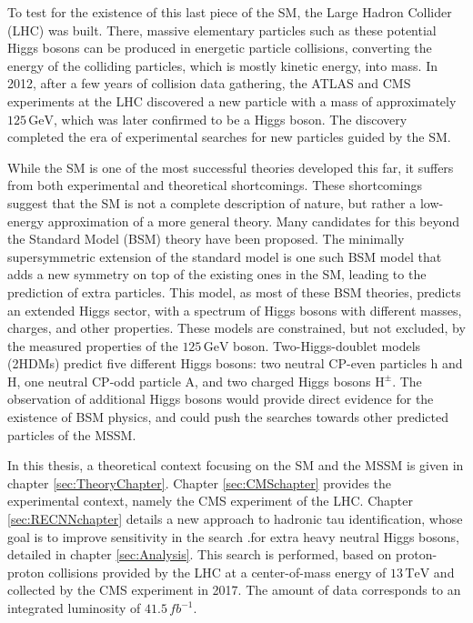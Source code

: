 To test for the existence of this last piece of the SM, the Large Hadron Collider (LHC) was built. There, massive elementary particles such as these potential Higgs bosons can be produced in energetic particle collisions, converting the energy of the colliding particles, which is mostly kinetic energy, into mass. In 2012, after a few years of collision data gathering, the ATLAS and CMS experiments at the LHC discovered a new particle with a mass of approximately $125\,\mathrm{GeV}$, which was later confirmed to be a Higgs boson. The discovery completed the era of experimental searches for new particles guided by the SM.

While the SM is one of the most successful theories developed this far, it suffers from
both experimental and theoretical shortcomings. These shortcomings suggest that the SM is not a complete description of nature, but rather a low-energy approximation of a more general theory. Many candidates for this beyond the Standard Model (BSM) theory have been proposed. The minimally supersymmetric extension of the standard model is one such BSM model that adds a new symmetry on top of the existing ones in the SM, leading to the prediction of extra particles. This model, as most of these BSM theories, predicts an extended Higgs sector, with a spectrum of Higgs bosons with different masses, charges, and other properties.  These models are constrained, but not excluded, by the measured properties of the $125\,\mathrm{GeV}$ boson. Two-Higgs-doublet models (2HDMs) predict five different Higgs bosons: two neutral CP-even particles h and H, one neutral CP-odd particle A, and two charged Higgs bosons $\mathrm{H^{\pm}}$. The observation of additional Higgs bosons would provide direct evidence for the existence of BSM physics, and could push the searches towards other predicted particles of the MSSM.

In this thesis, a theoretical context focusing on the SM and the MSSM is given in chapter \ref{sec:TheoryChapter}. Chapter \ref{sec:CMSchapter} provides the experimental context, namely the CMS experiment of the LHC. Chapter \ref{sec:RECNNchapter} details a new approach to hadronic tau identification, whose goal is to improve sensitivity in the search .for extra heavy neutral Higgs bosons, detailed in chapter \ref{sec:Analysis}. This search is performed, based on proton-proton collisions  provided  by  the  LHC  at  a  center-of-mass  energy  of $13\,\mathrm{TeV}$ and collected by the CMS experiment in 2017.  The amount of data corresponds to an integrated luminosity of $41.5\,fb^{-1}$.




